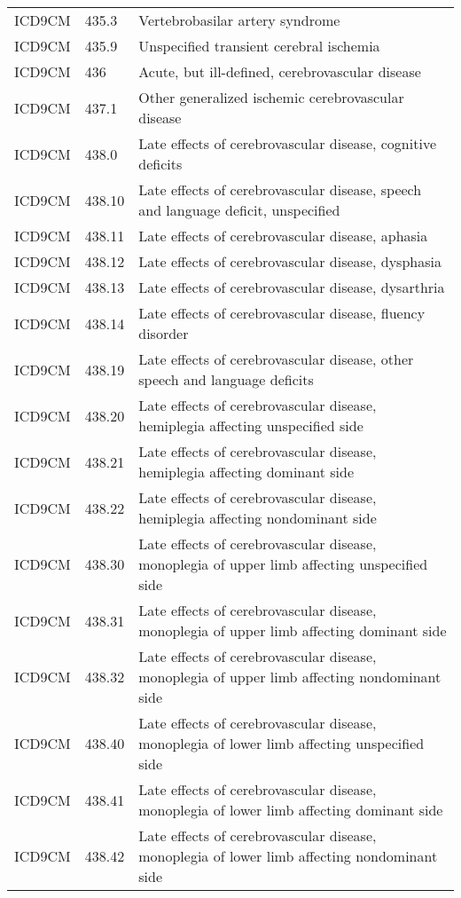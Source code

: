 \begin{longtable}{p{}p{}p{}}
  ICD9CM & 435.3 & Vertebrobasilar artery syndrome \\ 
  ICD9CM & 435.9 & Unspecified transient cerebral ischemia \\ 
  ICD9CM & 436 & Acute, but ill-defined, cerebrovascular disease \\ 
  ICD9CM & 437.1 & Other generalized ischemic cerebrovascular disease \\ 
  ICD9CM & 438.0 & Late effects of cerebrovascular disease, cognitive deficits \\ 
  ICD9CM & 438.10 & Late effects of cerebrovascular disease, speech and language deficit, unspecified \\ 
  ICD9CM & 438.11 & Late effects of cerebrovascular disease, aphasia \\ 
  ICD9CM & 438.12 & Late effects of cerebrovascular disease, dysphasia \\ 
  ICD9CM & 438.13 & Late effects of cerebrovascular disease, dysarthria \\ 
  ICD9CM & 438.14 & Late effects of cerebrovascular disease, fluency disorder \\ 
  ICD9CM & 438.19 & Late effects of cerebrovascular disease, other speech and language deficits \\ 
  ICD9CM & 438.20 & Late effects of cerebrovascular disease, hemiplegia affecting unspecified side \\ 
  ICD9CM & 438.21 & Late effects of cerebrovascular disease, hemiplegia affecting dominant side \\ 
  ICD9CM & 438.22 & Late effects of cerebrovascular disease, hemiplegia affecting nondominant side \\ 
  ICD9CM & 438.30 & Late effects of cerebrovascular disease, monoplegia of upper limb affecting unspecified side \\ 
  ICD9CM & 438.31 & Late effects of cerebrovascular disease, monoplegia of upper limb affecting dominant side \\ 
  ICD9CM & 438.32 & Late effects of cerebrovascular disease, monoplegia of upper limb affecting nondominant side \\ 
  ICD9CM & 438.40 & Late effects of cerebrovascular disease, monoplegia of lower limb affecting unspecified side \\ 
  ICD9CM & 438.41 & Late effects of cerebrovascular disease, monoplegia of lower limb affecting dominant side \\ 
  ICD9CM & 438.42 & Late effects of cerebrovascular disease, monoplegia of lower limb affecting nondominant side \\ 

\end{longtable}
